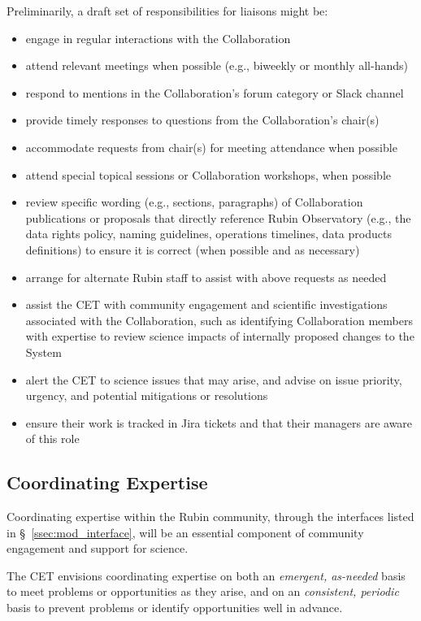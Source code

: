 \documentclass[DM,lsstdraft,toc]{lsstdoc}
\begin{document}
Preliminarily, a draft set of responsibilities for liaisons might be:
\begin{itemize}
\item engage in regular interactions with the Collaboration
\item attend relevant meetings when possible (e.g., biweekly or monthly all-hands)
\item respond to mentions in the Collaboration's forum category or Slack channel
\item provide timely responses to questions from the Collaboration's chair(s)
\item accommodate requests from chair(s) for meeting attendance when possible
\item attend special topical sessions or Collaboration workshops, when possible
\item review specific wording (e.g., sections, paragraphs) of Collaboration publications or proposals that directly reference Rubin Observatory (e.g., the data rights policy, naming guidelines, operations timelines, data products definitions) to ensure it is correct (when possible and as necessary)
\item arrange for alternate Rubin staff to assist with above requests as needed
\item assist the CET with community engagement and scientific investigations associated with the Collaboration, such as identifying Collaboration members with expertise to review science impacts of internally proposed changes to the System
\item alert the CET to science issues that may arise, and advise on issue priority, urgency, and potential mitigations or resolutions
\item ensure their work is tracked in Jira tickets and that their managers are aware of this role
\end{itemize}



\subsection{Coordinating Expertise}\label{ssec:mod_coord}

Coordinating expertise within the Rubin community, through the interfaces listed in \S~\ref{ssec:mod_interface}, will be an essential component of community engagement and support for science.

The CET envisions coordinating expertise on both an \textit{emergent, as-needed} basis to meet problems or opportunities as they arise, and on an \textit{consistent, periodic} basis to prevent problems or identify opportunities well in advance.
\end{document}
